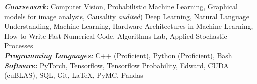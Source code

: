 \documentclass[9pt]{article}
\newenvironment{changemargin}[2]{%
  \begin{list}{}{%
      \setlength{\topsep}{0pt}%
    \setlength{\leftmargin}{#1}%
    \setlength{\rightmargin}{#2}%
    \setlength{\listparindent}{\parindent}%
  \setlength{\itemindent}{\parindent}%
    \setlength{\parsep}{\parskip}%
    }%
  \item[]}{\end{list}
    }
\newenvironment{body} {
  \vspace*{-16pt}
        \begin{changemargin}{-0.6in}{-0.65in}
        }	
        {\end{changemargin}
}
\begin{document}
\vspace{3 mm}
\begin{body}
  \vspace{14pt}
        \begin{changemargin}{0.15in}{0.15in}
          \emph{\textbf{Coursework:}} Computer Vision, Probabilistic Machine Learning,
          Graphical models for image analysis, Causality \emph{audited})
          Deep Learning, Natural Language Understanding, Machine 
          Learning, Hardware Architectures in Machine Learning, 
          How to Write Fast Numerical Code, Algorithms Lab, Applied Stochastic Processes \\
          \emph{\textbf{Programming Languages: }}{} C++ (Proficient), Python (Proficient), 
          Bash\\
          \emph{\textbf{Software: }}{} PyTorch, Tensorflow, Tensorflow Probability, Edward, CUDA (cuBLAS),
          SQL, Git, \LaTeX, PyMC, Pandas \\
        \end{changemargin}
\end{body}
\end{document}
